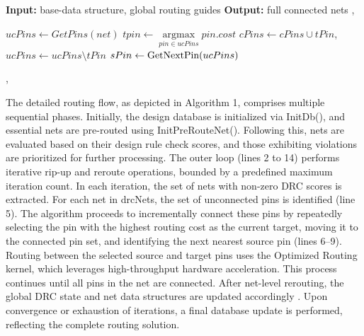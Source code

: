 \documentclass[conference]{IEEEtran}
\begin{document}

\begin{algorithm}[hpt]
\caption{Detailed Routing Flow}
\label{alg:detail_routing_algorithm}
\begin{algorithmic}[1]
\Statex \textbf{Input:} base-data structure, global routing guides
\Statex \textbf{Output:} full connected nets
\STATE {}, 

    \STATE {}
        \STATE $\text{$ucPins$} \gets \text{$GetPins(net)$}$
            \STATE $\text{$tpin$} \gets \mathop{\arg\max}\limits_{pin \in ucPins} \text{$pin.cost$}$
            \STATE $\text{$cPins$} \gets \text{$cPins$} \cup \text{$tPin$}$, $\text{$ucPins$} \gets \text{$ucPins$} \setminus \text{$tPin$}$
            \STATE $\text{$sPin$} \gets \text{GetNextPin(\text{$ucPins$})}$
            \STATE {}
        \ENDWHILE
    \ENDWHILE
    
    \STATE {}, 
\ENDWHILE
\STATE {}
\end{algorithmic}
\end{algorithm}


The detailed routing flow, as depicted in Algorithm 1, comprises multiple sequential phases. Initially, the design database is initialized via InitDb(), and essential nets are pre-routed using InitPreRouteNet(). Following this, nets are evaluated based on their design rule check scores, and those exhibiting violations are prioritized for further processing.
The outer loop (lines 2 to 14) performs iterative rip-up and reroute operations, bounded by a predefined maximum iteration count. In each iteration, the set of nets with non-zero DRC scores is extracted. For each net in drcNets, the set of unconnected pins is identified (line 5). The algorithm proceeds to incrementally connect these pins by repeatedly selecting the pin with the highest routing cost as the current target, moving it to the connected pin set, and identifying the next nearest source pin (lines 6–9).
Routing between the selected source and target pins uses the Optimized Routing kernel, which leverages high-throughput hardware acceleration. This process continues until all pins in the net are connected. After net-level rerouting, the global DRC state and net data structures are updated accordingly . Upon convergence or exhaustion of iterations, a final database update is performed, reflecting the complete routing solution.
\end{document}
